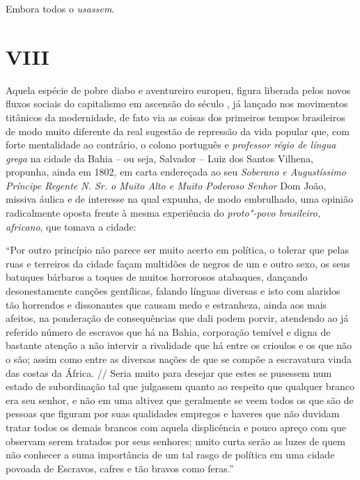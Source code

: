 Embora todos o \emph{usassem}.

\section{VIII}

Aquela espécie de pobre diabo e aventureiro europeu, figura liberada
pelos novos fluxos sociais do capitalismo em ascensão do século , já
lançado nos movimentos titânicos da modernidade, de fato via as coisas
dos primeiros tempos brasileiros de modo muito diferente da real
sugestão de repressão da vida popular que, com forte mentalidade ao
contrário, o colono português e \emph{professor régio de língua grega}
na cidade da Bahia -- ou seja, Salvador -- Luiz dos Santos Vilhena,
propunha, ainda em 1802, em carta endereçada ao seu \emph{Soberano e
Augustíssimo Príncipe Regente N. Sr. o Muito Alto e Muito Poderoso
Senhor} Dom João, missiva áulica e de interesse na qual expunha, de modo
embrulhado, uma opinião radicalmente oposta frente à mesma experiência
do \emph{proto"-povo brasileiro, africano}, que tomava a cidade:

``Por outro princípio não parece ser muito acerto em política, o tolerar
que pelas ruas e terreiros da cidade façam multidões de negros de um e
outro sexo, os seus batuques bárbaros a toques de muitos horrorosos
atabaques, dançando desonestamente canções gentílicas, falando línguas
diversas e isto com alaridos tão horrendos e dissonantes que causam medo
e estranheza, ainda aos mais afeitos, na ponderação de consequências que
dali podem porvir, atendendo ao já referido número de escravos que há na
Bahia, corporação temível e digna de bastante atenção a não intervir a
rivalidade que há entre os crioulos e os que não o são; assim como entre
as diversas nações de que se compõe a escravatura vinda das costas da
África. // Seria muito para desejar que estes se pusessem num estado de
subordinação tal que julgassem quanto ao respeito que qualquer branco
era seu senhor, e não em uma altivez que geralmente se veem todos os que
são de pessoas que figuram por suas qualidades empregos e haveres que
não duvidam tratar todos os demais brancos com aquela displicência e
pouco apreço com que observam serem tratados por seus senhores; muito
curta serão as luzes de quem não conhecer a suma importância de um tal
rasgo de política em uma cidade povoada de Escravos, cafres e tão bravos
como feras.''


